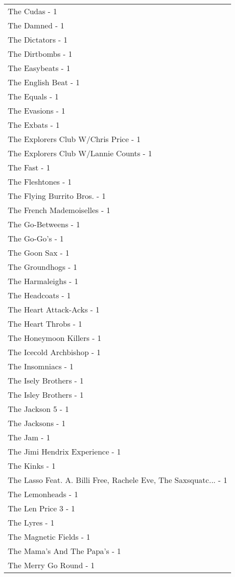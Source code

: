 \documentclass[
]{article}
\begin{document}
\begin{longtable}{l}
The Cudas - 1 \\ 
The Damned - 1 \\ 
The Dictators - 1 \\ 
The Dirtbombs - 1 \\ 
The Easybeats - 1 \\ 
The English Beat - 1 \\ 
The Equals - 1 \\ 
The Evasions - 1 \\ 
The Exbats - 1 \\ 
The Explorers Club W/Chris Price - 1 \\ 
The Explorers Club W/Lannie Counts - 1 \\ 
The Fast - 1 \\ 
The Fleshtones - 1 \\ 
The Flying Burrito Bros. - 1 \\ 
The French Mademoiselles - 1 \\ 
The Go-Betweens - 1 \\ 
The Go-Go's - 1 \\ 
The Goon Sax - 1 \\ 
The Groundhogs - 1 \\ 
The Harmaleighs - 1 \\ 
The Headcoats - 1 \\ 
The Heart Attack-Acks - 1 \\ 
The Heart Throbs - 1 \\ 
The Honeymoon Killers - 1 \\ 
The Icecold Archbishop - 1 \\ 
The Insomniacs - 1 \\ 
The Isely Brothers - 1 \\ 
The Isley Brothers - 1 \\ 
The Jackson 5 - 1 \\ 
The Jacksons - 1 \\ 
The Jam - 1 \\ 
The Jimi Hendrix Experience - 1 \\ 
The Kinks - 1 \\ 
The Lasso Feat. A. Billi Free, Rachele Eve, The Saxsquatc... - 1 \\ 
The Lemonheads - 1 \\ 
The Len Price 3 - 1 \\ 
The Lyres - 1 \\ 
The Magnetic Fields - 1 \\ 
The Mama's And The Papa's - 1 \\ 
The Merry Go Round - 1 \\ 

\end{longtable}
\end{document}
